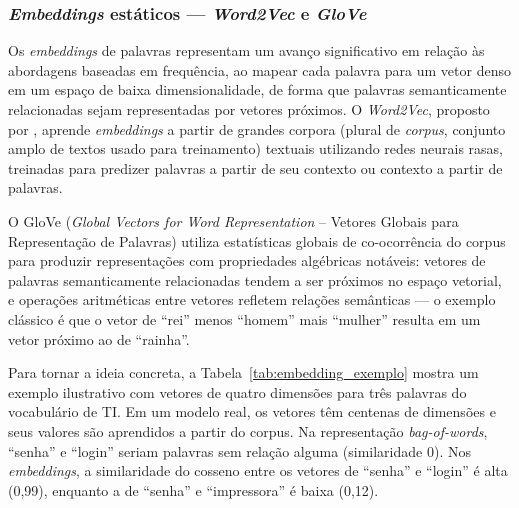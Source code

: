 \documentclass[
    12pt,                %
    openright,           %
    oneside,             %
    a4paper,             %
    english,             %
    brazil               %
]{abntex2}
\begin{document}
\subsubsection{\textit{Embeddings} estáticos — \textit{Word2Vec} e \textit{GloVe}}
\label{subsubsec:pln_embeddings}

Os \textit{embeddings} de palavras representam um avanço significativo em relação às abordagens baseadas em frequência, ao mapear cada palavra para um vetor denso em um espaço de baixa dimensionalidade, de forma que palavras semanticamente relacionadas sejam representadas por vetores próximos. O \textit{Word2Vec}, proposto por , aprende \textit{embeddings} a partir de grandes corpora (plural de \textit{corpus}, conjunto amplo de textos usado para treinamento) textuais utilizando redes neurais rasas, treinadas para predizer palavras a partir de seu contexto ou contexto a partir de palavras. 

O GloVe (\textit{Global Vectors for Word Representation} -- Vetores Globais para Representação de Palavras) utiliza 
estatísticas globais de co-ocorrência do corpus para produzir 
representações com propriedades algébricas notáveis: vetores de 
palavras semanticamente relacionadas tendem a ser próximos no espaço 
vetorial, e operações aritméticas entre vetores refletem relações 
semânticas — o exemplo clássico é que o vetor de ``rei'' menos 
``homem'' mais ``mulher'' resulta em um vetor próximo ao de ``rainha''.

Para tornar a ideia concreta, a Tabela~\ref{tab:embedding_exemplo} mostra um exemplo ilustrativo com vetores de quatro dimensões para três palavras do vocabulário de TI. Em um modelo real, os vetores têm centenas de dimensões e seus valores são aprendidos a partir do corpus. Na representação \textit{bag-of-words}, ``senha'' e ``login'' seriam palavras sem relação alguma (similaridade 0). Nos \textit{embeddings}, a similaridade do cosseno entre os vetores de ``senha'' e ``login'' é alta (0,99), enquanto a de ``senha'' e ``impressora'' é baixa (0,12).
 
\end{document}
